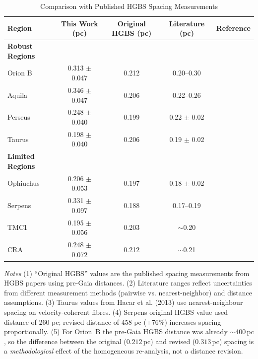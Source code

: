 \documentclass[usenatbib,twoside,twocolumn]{mnras}
\begin{document}
\begin{table}
\caption{Comparison with Published HGBS Spacing Measurements}
\label{tab:literature}
\begin{tabular}{lcccc}
\toprule
Region & This Work (pc) & Original HGBS (pc) & Literature (pc) & Reference \\
\midrule
\textbf{Robust Regions} &  &  &  &  \\
Orion B & 0.313 $\pm$ 0.047 & 0.212 & 0.20--0.30 & \citet{Konyves2020} \\
Aquila  & 0.346 $\pm$ 0.047 & 0.206 & 0.22--0.26 & \citet{Konyves2015} \\
Perseus & 0.248 $\pm$ 0.040 & 0.199 & 0.22 $\pm$ 0.02 & \citet{Pezzuto2021} \\
Taurus  & 0.198 $\pm$ 0.040 & 0.206 & 0.19 $\pm$ 0.02 & \citet{Hacar2013} \\
\midrule
\textbf{Limited Regions} &  &  &  &  \\
Ophiuchus & 0.206 $\pm$ 0.053 & 0.197 & 0.18 $\pm$ 0.02 & \citet{Konyves2020} \\
Serpens  & 0.331 $\pm$ 0.097 & 0.188 & 0.17--0.19 & \citet{Konyves2020} \\
TMC1     & 0.195 $\pm$ 0.056 & 0.203 & $\sim$0.20 & \citet{Hacar2013} \\
CRA      & 0.248 $\pm$ 0.072 & 0.212 & $\sim$0.21 & \citet{Konyves2020} \\
\bottomrule
\end{tabular}

\vspace{0.1in}
\footnotesize
\emph{Notes} (1) ``Original HGBS'' values are the published spacing measurements from HGBS papers using pre-Gaia distances. (2) Literature ranges reflect uncertainties from different measurement methods (pairwise vs. nearest-neighbor) and distance assumptions. (3) Taurus values from Hacar et al. (2013) use nearest-neighbour spacing on velocity-coherent fibres. (4) Serpens original HGBS value used distance of 260 pc; revised distance of 458 pc (+76\%) increases spacing proportionally. (5) For Orion~B the pre-Gaia HGBS distance was already $\sim$400\,pc \citep{Konyves2020}, so the difference between the original ($0.212$\,pc) and revised ($0.313$\,pc) spacing is a \emph{methodological} effect of the homogeneous re-analysis, not a distance revision.
\end{table}
\end{document}
